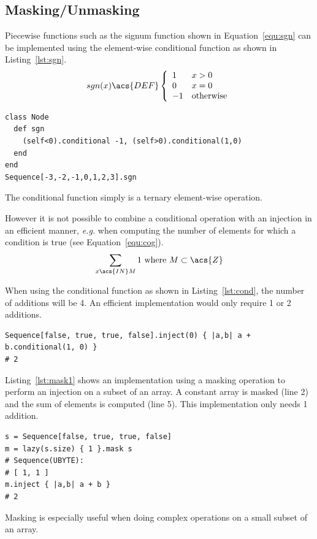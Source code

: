 \documentclass[12pt,a4paper,oneside,openright]{book}
\newcommand{\eg}{\emph{e.g.} }
\newcommand{\equ}[1]{Equation~\ref{equ:#1}}
\newcommand{\lst}[1]{Listing~\ref{lst:#1}}
\begin{document}
\begin{CJK}{UTF8}{}
\subsection{Masking/Unmasking}
Piecewise functions such as the signum function shown in \equ{sgn} can be implemented using the element-wise conditional function as shown in \lst{sgn}.
\begin{equation}\label{equ:sgn}
  sgn(x)\acs{DEF}\left\{\begin{array}{ll}1&x>0\\0&x=0\\-1&\mathrm{otherwise}\end{array}\right.
\end{equation}
\lstset{language=Ruby,frame=single,numbers=none}
\begin{lstlisting}[float,caption={Conditional selection as element-wise operation},label=lst:sgn]
class Node
  def sgn
    (self<0).conditional -1, (self>0).conditional(1,0)
  end
end
Sequence[-3,-2,-1,0,1,2,3].sgn
\end{lstlisting}
The conditional function simply is a ternary element-wise operation.

However it is not possible to combine a conditional operation with an injection in an efficient manner, \eg when computing the number of elements for which a condition is true (see \equ{cog}).
\begin{equation}\label{equ:cog}
  \sum_{x\acs{IN}M}1\mathrm{\ where\ }M\subset\acs{Z}
\end{equation}

When using the conditional function as shown in \lst{cond}, the number of additions will be 4. An efficient implementation would only require 1 or 2 additions.
\lstset{language=Ruby,frame=single,numbers=none}
\begin{lstlisting}[float,caption={Injection with a conditional},label=lst:cond]
Sequence[false, true, true, false].inject(0) { |a,b| a + b.conditional(1, 0) }
# 2
\end{lstlisting}

\lst{mask1} shows an implementation using a masking operation to perform an injection on a subset of an array. A constant array is masked (line 2) and the sum of elements is computed (line 5). This implementation only needs 1 addition.
\lstset{language=Ruby,frame=single,numbers=left}
\begin{lstlisting}[float,caption={Injection on a subset of an array},label=lst:mask1]
s = Sequence[false, true, true, false]
m = lazy(s.size) { 1 }.mask s
# Sequence(UBYTE):
# [ 1, 1 ]
m.inject { |a,b| a + b }
# 2
\end{lstlisting}
Masking is especially useful when doing complex operations on a small subset of an array.


\end{CJK}
\end{document}
